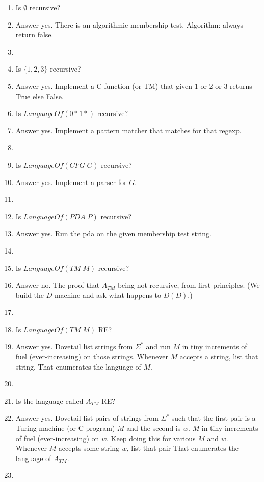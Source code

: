 \documentclass[10pt]{article}
\begin{document}
\begin{enumerate}
\item Is $\emptyset$ recursive?
\item[] {\sf Answer yes. There is an algorithmic membership test. Algorithm: always return false.}
\item[]
  
\item Is $\{1,2,3\}$ recursive?
\item[] {\sf Answer yes. Implement a C function (or TM) that given 1 or 2 or 3 returns True else False.}

\item Is $LanguageOf(0*1*)$ recursive?
\item[] {\sf Answer yes. Implement a pattern matcher that matches for that regexp.}
\item[]

\item Is $LanguageOf(CFG\; G)$ recursive?
\item[] {\sf Answer yes. Implement a parser for $G$.}
\item[]

\item Is $LanguageOf(PDA\; P)$ recursive?
\item[] {\sf Answer yes. Run the pda on the given membership test string.}
\item[]  

\item Is $LanguageOf(TM\; M)$ recursive?
\item[] {\sf Answer no.} The proof that $A_{TM}$ being not recursive, from first principles. (We build the $D$ machine
   and ask what happens to $D(D)$.)
\item[]  

\item Is $LanguageOf(TM\; M)$ RE?
\item[] {\sf Answer yes.} Dovetail list strings from
  $\Sigma^*$ and run $M$ in tiny increments of fuel (ever-increasing) on those strings. Whenever
  $M$ accepts a string, list that string. That enumerates the language of $M$.
\item[]

\item Is the language called $A_{TM}$ RE?
\item[] {\sf Answer yes.} Dovetail list pairs of strings from $\Sigma^*$
  such that the first pair is a Turing machine (or C program) $M$ and the second is $w$.
  $M$ in tiny increments of fuel (ever-increasing) on $w$. Keep doing this for various $M$ and $w$.
  Whenever
  $M$ accepts some string $w$, list that pair That enumerates the language of $A_{TM}$.
\item[]    
\end{enumerate}
\end{document}
